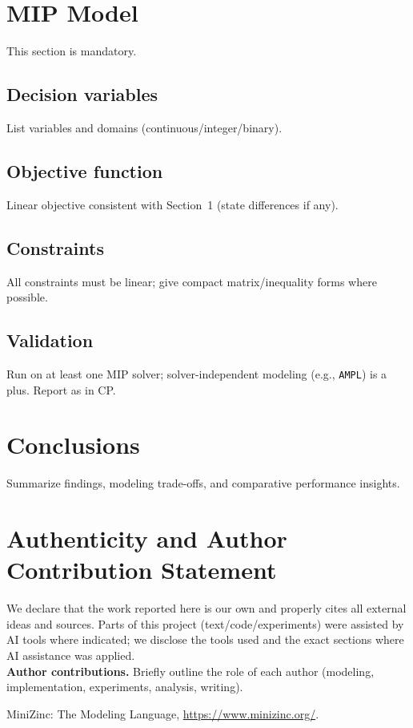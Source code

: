 \documentclass{article}
\begin{document}
\section{MIP Model}
This section is mandatory.

\subsection{Decision variables}
List variables and domains (continuous/integer/binary).

\subsection{Objective function}
Linear objective consistent with Section~1 (state differences if any).

\subsection{Constraints}
All constraints must be linear; give compact matrix/inequality forms where possible.

\subsection{Validation}
Run on at least one MIP solver; solver-independent modeling (e.g., \texttt{AMPL}) is a plus.
Report as in CP.

\section{Conclusions}
Summarize findings, modeling trade-offs, and comparative performance insights.

\section*{Authenticity and Author Contribution Statement}
We declare that the work reported here is our own and properly cites all external ideas and sources.
Parts of this project (text/code/experiments) were assisted by AI tools where indicated; we disclose the tools used and the exact sections where AI assistance was applied.
\\[0.5em]
\textbf{Author contributions.} Briefly outline the role of each author (modeling, implementation, experiments, analysis, writing).

\begin{thebibliography}{9}

MiniZinc: The Modeling Language,
\url{https://www.minizinc.org/}.


\end{thebibliography}
\end{document}
